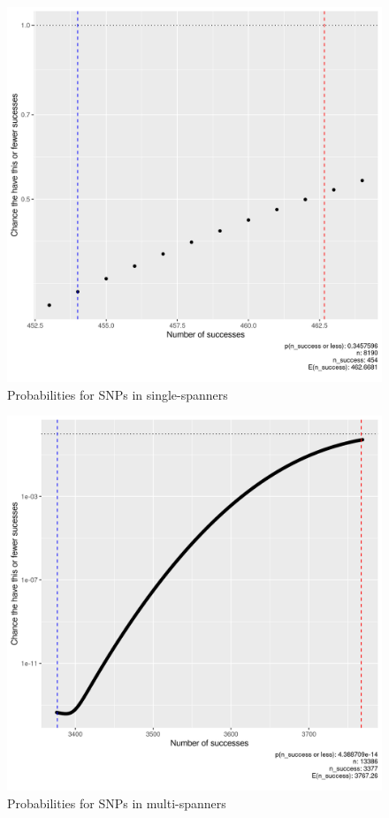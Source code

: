 \begin{figure}[!htbp]
  \includegraphics[width=\textwidth]{ncbi_peregrine_results/ppoisbinom_single.png}
  \caption{
    Probabilities for SNPs in single-spanners
  }
  \label{fig:ppoisbinom_single}
\end{figure}

\begin{figure}[!htbp]
  \includegraphics[width=\textwidth]{ncbi_peregrine_results/ppoisbinom_multi.png}
  \caption{
    Probabilities for SNPs in multi-spanners
  }
  \label{fig:ppoisbinom_multi}
\end{figure}


